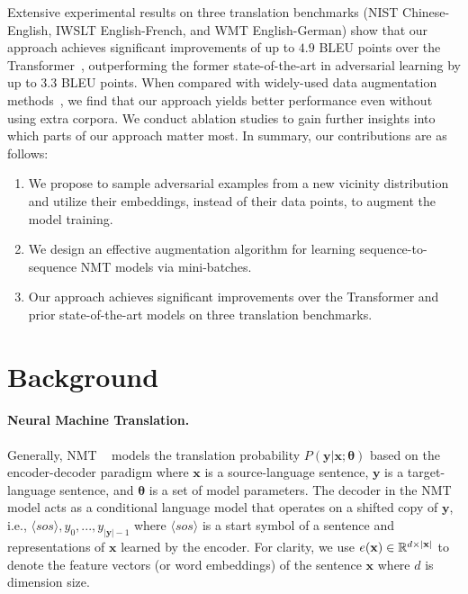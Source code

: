 \documentclass[11pt,a4paper]{article}
\begin{document}
Extensive experimental results on three translation benchmarks (NIST Chinese-English, IWSLT English-French, and WMT English-German) show that our approach achieves significant improvements of up to $4.9$ BLEU points over the Transformer~\cite{Vaswani:17}, outperforming the former state-of-the-art in adversarial learning \cite{Cheng:19} by up to $3.3$ BLEU points. When compared with widely-used data augmentation methods~\cite{Sennrich:16b, Edunov:18}, we find that our approach yields better performance even without using extra corpora.
We conduct ablation studies to gain further insights into which parts of our approach matter most. In summary, our contributions are as follows:
\begin{enumerate}
    \item We propose to sample adversarial examples from a new vicinity distribution and utilize their embeddings, instead of their data points, to augment the model training.
    \item We design an effective augmentation algorithm for learning sequence-to-sequence NMT models via mini-batches. 
    \item Our approach achieves significant improvements over the Transformer and prior state-of-the-art models on three translation benchmarks.
\end{enumerate}


\section{Background}

\paragraph{Neural Machine Translation.}
Generally, NMT ~\cite{Bahdanau:15, Gehring:17, Vaswani:17} models the translation probability $P(\mathbf{y}|\mathbf{x};\bm{\theta})$ based on the encoder-decoder paradigm where $\mathbf{x}$ is a source-language sentence, $\mathbf{y}$ is a target-language sentence, and $\bm{\theta}$ is a set of model parameters. 
The decoder in the NMT model acts as a conditional language model that operates on a shifted copy of $\mathbf{y}$, i.e., $\langle sos \rangle, y_{0},...,y_{|\mathbf{y}|-1}$ where $\langle sos \rangle$ is a start symbol of a sentence and representations of $\mathbf{x}$ learned by the encoder.
For clarity, we use $e(\mathbf{x}) \in \mathbb{R}^{d \times \vert \mathbf{x} \vert}$ to denote the feature vectors (or word embeddings) of the sentence $\mathbf{x}$ where $d$ is dimension size.
\end{document}
